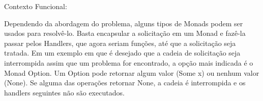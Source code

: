 Contexto Funcional:

Dependendo da abordagem do problema, alguns tipos de Monads 
podem ser usados para resolvê-lo. Basta encapsular a 
solicitação em um Monad e fazê-la passar pelos Handlers, que 
agora seriam funções, até que a solicitação seja tratada. Em 
um exemplo em que é desejado que a cadeia de solicitação seja 
interrompida assim que um problema for encontrado, a opção 
mais indicada é o Monad Option. Um Option pode retornar algum 
valor (Some x) ou nenhum valor (None). Se alguma das operações 
retornar None, a cadeia é interrompida e os handlers 
seguintes não são executados.

\begin{lstlisting}[caption={Chain of Responsibility Funcional},label=fpchresponsibility]
    

    
\end{lstlisting}